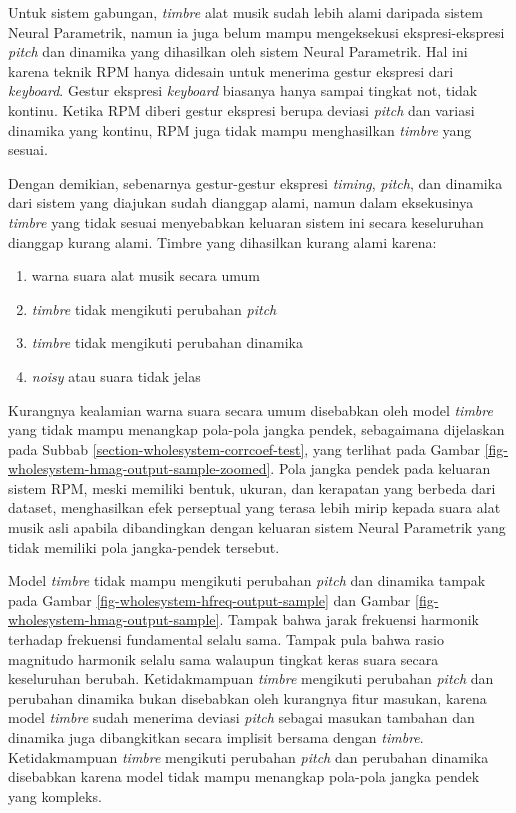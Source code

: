Untuk sistem gabungan, \textit{timbre} alat musik sudah lebih alami daripada sistem Neural Parametrik, namun ia juga belum mampu mengeksekusi ekspresi-ekspresi \textit{pitch} dan dinamika yang dihasilkan oleh sistem Neural Parametrik. Hal ini karena teknik RPM hanya didesain untuk menerima gestur ekspresi dari \textit{keyboard}. Gestur ekspresi \textit{keyboard} biasanya hanya sampai tingkat not, tidak kontinu. Ketika RPM diberi gestur ekspresi berupa deviasi \textit{pitch} dan variasi dinamika yang kontinu, RPM juga tidak mampu menghasilkan \textit{timbre} yang sesuai.

Dengan demikian, sebenarnya gestur-gestur ekspresi \textit{timing}, \textit{pitch}, dan dinamika dari sistem yang diajukan sudah dianggap alami, namun dalam eksekusinya \textit{timbre} yang tidak sesuai menyebabkan keluaran sistem ini secara keseluruhan dianggap kurang alami. Timbre yang dihasilkan kurang alami karena:

\begin{enumerate}
	\item warna suara alat musik secara umum
	\item \textit{timbre} tidak mengikuti perubahan \textit{pitch}
	\item \textit{timbre} tidak mengikuti perubahan dinamika
	\item \textit{noisy} atau suara tidak jelas
\end{enumerate}



Kurangnya kealamian warna suara secara umum disebabkan oleh model \textit{timbre} yang tidak mampu menangkap pola-pola jangka pendek, sebagaimana dijelaskan pada Subbab \ref{section-wholesystem-corrcoef-test}, yang terlihat pada Gambar \ref{fig-wholesystem-hmag-output-sample-zoomed}. Pola jangka pendek pada keluaran sistem RPM, meski memiliki bentuk, ukuran, dan kerapatan yang berbeda dari dataset, menghasilkan efek perseptual yang terasa lebih mirip kepada suara alat musik asli apabila dibandingkan dengan keluaran sistem Neural Parametrik yang tidak memiliki pola jangka-pendek tersebut.

Model \textit{timbre} tidak mampu mengikuti perubahan \textit{pitch} dan dinamika tampak pada Gambar \ref{fig-wholesystem-hfreq-output-sample} dan Gambar \ref{fig-wholesystem-hmag-output-sample}. Tampak bahwa jarak frekuensi harmonik terhadap frekuensi fundamental selalu sama. Tampak pula bahwa rasio magnitudo harmonik selalu sama walaupun tingkat keras suara secara keseluruhan berubah. Ketidakmampuan \textit{timbre} mengikuti perubahan \textit{pitch} dan perubahan dinamika bukan disebabkan oleh kurangnya fitur masukan, karena model \textit{timbre} sudah menerima deviasi \textit{pitch} sebagai masukan tambahan dan dinamika juga dibangkitkan secara implisit bersama dengan \textit{timbre}. Ketidakmampuan \textit{timbre} mengikuti perubahan \textit{pitch} dan perubahan dinamika disebabkan karena model tidak mampu menangkap pola-pola jangka pendek yang kompleks.

